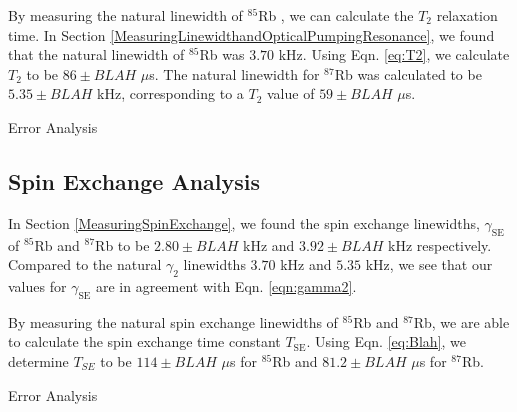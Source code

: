 By measuring the natural linewidth of $^{85}$Rb , we can calculate the $T_2$ relaxation time.  In Section \ref{MeasuringLinewidthandOpticalPumpingResonance}, we found that the natural linewidth of $^{85}$Rb was $3.70$ kHz.  Using Eqn. \ref{eq:T2}, we calculate $T_2$ to be $86 \pm BLAH$ $\mu$s. The natural linewidth for $^{87}$Rb was calculated to be $5.35 \pm BLAH$ kHz, corresponding to a $T_2$ value of  $59 \pm BLAH$ $\mu$s.

Error Analysis


\subsection{Spin Exchange Analysis}\label{SpinExchangeAnalysis}

In Section \ref{MeasuringSpinExchange}, we found the spin exchange linewidths, $\gamma_{\mathrm{SE}}$ of $^{85}$Rb and $^{87}$Rb to be $2.80 \pm BLAH$ kHz and $3.92 \pm BLAH$ kHz respectively. Compared to the natural $\gamma_2$ linewidths $3.70$ kHz  and $5.35$ kHz, we see that our values for $\gamma_{\mathrm{SE}}$ are in agreement with Eqn. \ref{eqn:gamma2}.

By measuring the natural spin exchange linewidths of $^{85}$Rb and $^{87}$Rb, we are able to calculate the spin exchange time constant $T_{\mathrm{SE}}$.  Using Eqn. \ref{eq:Blah}, we determine $T_{SE}$ to be $114 \pm BLAH$ $\mu$s for  $^{85}$Rb and $81.2 \pm BLAH$ $\mu$s for  $^{87}$Rb. 


Error Analysis